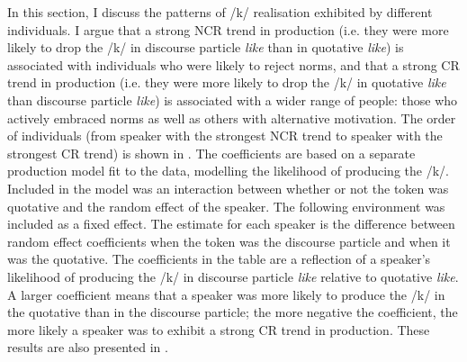 In this section, I discuss the patterns of /k/ realisation exhibited by different individuals. I argue that a strong NCR trend in production (i.e. they were more likely to drop the /k/ in discourse particle \textit{like} than in quotative \textit{like}) is associated with individuals who were likely to reject norms, and that a strong CR trend in production (i.e. they were more likely to drop the /k/ in quotative \textit{like} than discourse particle \textit{like}) is associated with a wider range of people: those who actively embraced norms as well as others with alternative motivation. The order of individuals (from speaker with the strongest NCR trend to speaker with the strongest CR trend) is shown in . The coefficients are based on a separate production model fit to the data, modelling the likelihood of producing the /k/. Included in the model was an interaction between whether or not the token was quotative and the random effect of the speaker. The following environment was included as a fixed effect. The estimate for each speaker is the difference between random effect coefficients when the token was the discourse particle and when it was the quotative. The coefficients in the table are a reflection of a speaker's likelihood of producing the /k/ in discourse particle \textit{like} relative to quotative \textit{like}. A larger coefficient means that a speaker was more likely to produce the /k/ in the quotative than in the discourse particle; the more negative the coefficient, the more likely a speaker was to exhibit a strong CR trend in production. These results are also presented in \citet{dragerhay2012}.

